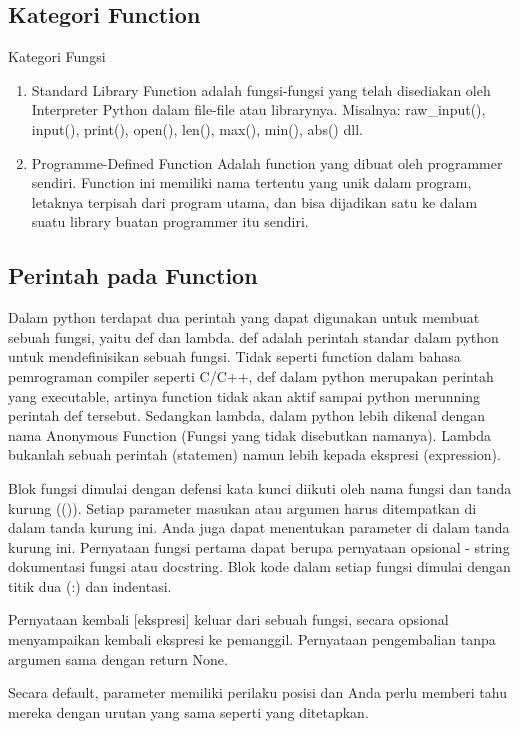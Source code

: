 \subsection{Kategori Function}
Kategori Fungsi
\begin{enumerate}
\item
Standard Library Function
adalah fungsi-fungsi yang telah disediakan oleh Interpreter Python dalam file-file atau librarynya.
 Misalnya: raw_input(), input(), print(), open(), len(), max(), min(), abs() dll.
\item
Programme-Defined Function
Adalah function yang dibuat oleh programmer sendiri. Function ini memiliki nama tertentu yang
unik dalam program, letaknya terpisah dari program utama, dan bisa dijadikan satu ke dalam suatu
library buatan programmer itu sendiri.
\end{enumerate}

\subsection{Perintah pada Function}
Dalam python terdapat dua perintah yang dapat digunakan untuk membuat sebuah fungsi,
yaitu def dan lambda. def adalah perintah standar dalam python untuk mendefinisikan sebuah
fungsi. Tidak seperti function dalam bahasa pemrograman compiler seperti C/C++, def dalam
python merupakan perintah yang executable, artinya function tidak akan aktif sampai python merunning
perintah def tersebut. Sedangkan lambda, dalam python lebih dikenal dengan nama
Anonymous Function (Fungsi yang tidak disebutkan namanya). Lambda bukanlah sebuah perintah
(statemen) namun lebih kepada ekspresi (expression).

Blok fungsi dimulai dengan defensi kata kunci diikuti oleh nama fungsi dan tanda kurung (()). 
Setiap parameter masukan atau argumen harus ditempatkan di dalam tanda kurung ini. Anda juga dapat menentukan parameter di dalam tanda kurung ini. 
Pernyataan fungsi pertama dapat berupa pernyataan opsional - string dokumentasi fungsi atau docstring. 
Blok kode dalam setiap fungsi dimulai dengan titik dua (:) dan indentasi. 

Pernyataan kembali [ekspresi] keluar dari sebuah fungsi, secara opsional menyampaikan kembali ekspresi ke pemanggil. Pernyataan pengembalian tanpa argumen sama dengan return None.

Secara default, parameter memiliki perilaku posisi dan Anda perlu memberi tahu mereka dengan urutan yang sama seperti yang ditetapkan.

